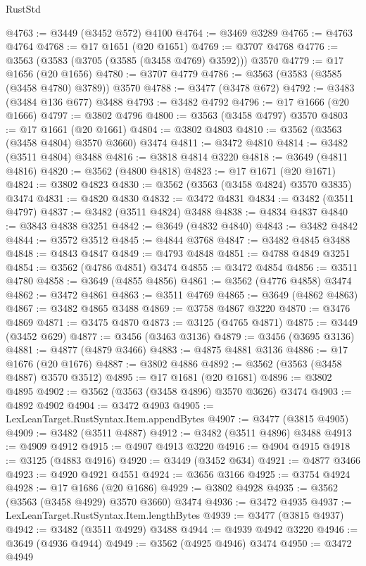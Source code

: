 \begin{lexlean}{RustStd}
\begin{coremodule}
{\begin{coremodule}
{{{{{{{{{{{{{{{{{{{{{{{{{{{{{{{{{{{{{{{{{{{{{@4763 := @3449 (@3452 @572) @4100
@4764 := @3469 @3289
@4765 := @4763 @4764
@4768 := @17 @1651 (@20 @1651)
@4769 := @3707 @4768
@4776 := @3563 (@3583 (@3705 (@3585 (@3458 @4769) @3592))) @3570
@4779 := @17 @1656 (@20 @1656)
@4780 := @3707 @4779
@4786 := @3563 (@3583 (@3585 (@3458 @4780) @3789)) @3570
@4788 := @3477 (@3478 @672)
@4792 := @3483 (@3484 @136 @677) @3488
@4793 := @3482 @4792
@4796 := @17 @1666 (@20 @1666)
@4797 := @3802 @4796
@4800 := @3563 (@3458 @4797) @3570
@4803 := @17 @1661 (@20 @1661)
@4804 := @3802 @4803
@4810 := @3562 (@3563 (@3458 @4804) @3570 @3660) @3474
@4811 := @3472 @4810
@4814 := @3482 (@3511 @4804) @3488
@4816 := @3818 @4814 @3220
@4818 := @3649 (@4811 @4816)
@4820 := @3562 (@4800 @4818)
@4823 := @17 @1671 (@20 @1671)
@4824 := @3802 @4823
@4830 := @3562 (@3563 (@3458 @4824) @3570 @3835) @3474
@4831 := @4820 @4830
@4832 := @3472 @4831
@4834 := @3482 (@3511 @4797)
@4837 := @3482 (@3511 @4824) @3488
@4838 := @4834 @4837
@4840 := @3843 @4838 @3251
@4842 := @3649 (@4832 @4840)
@4843 := @3482 @4842
@4844 := @3572 @3512
@4845 := @4844 @3768
@4847 := @3482 @4845 @3488
@4848 := @4843 @4847
@4849 := @4793 @4848
@4851 := @4788 @4849 @3251
@4854 := @3562 (@4786 @4851) @3474
@4855 := @3472 @4854
@4856 := @3511 @4780
@4858 := @3649 (@4855 @4856)
@4861 := @3562 (@4776 @4858) @3474
@4862 := @3472 @4861
@4863 := @3511 @4769
@4865 := @3649 (@4862 @4863)
@4867 := @3482 @4865 @3488
@4869 := @3758 @4867 @3220
@4870 := @3476 @4869
@4871 := @3475 @4870
@4873 := @3125 (@4765 @4871)
@4875 := @3449 (@3452 @629)
@4877 := @3456 (@3463 @3136)
@4879 := @3456 (@3695 @3136)
@4881 := @4877 (@4879 @3466)
@4883 := @4875 @4881 @3136
@4886 := @17 @1676 (@20 @1676)
@4887 := @3802 @4886
@4892 := @3562 (@3563 (@3458 @4887) @3570 @3512)
@4895 := @17 @1681 (@20 @1681)
@4896 := @3802 @4895
@4902 := @3562 (@3563 (@3458 @4896) @3570 @3626) @3474
@4903 := @4892 @4902
@4904 := @3472 @4903
@4905 := LexLeanTarget.RustSyntax.Item.appendBytes
@4907 := @3477 (@3815 @4905)
@4909 := @3482 (@3511 @4887)
@4912 := @3482 (@3511 @4896) @3488
@4913 := @4909 @4912
@4915 := @4907 @4913 @3220
@4916 := @4904 @4915
@4918 := @3125 (@4883 @4916)
@4920 := @3449 (@3452 @634)
@4921 := @4877 @3466
@4923 := @4920 @4921 @4551
@4924 := @3656 @3166
@4925 := @3754 @4924
@4928 := @17 @1686 (@20 @1686)
@4929 := @3802 @4928
@4935 := @3562 (@3563 (@3458 @4929) @3570 @3660) @3474
@4936 := @3472 @4935
@4937 := LexLeanTarget.RustSyntax.Item.lengthBytes
@4939 := @3477 (@3815 @4937)
@4942 := @3482 (@3511 @4929) @3488
@4944 := @4939 @4942 @3220
@4946 := @3649 (@4936 @4944)
@4949 := @3562 (@4925 @4946) @3474
@4950 := @3472 @4949
}}}}}}}}}}}}}}}}}}}}}}}}}}}}}}}}}}}}}}}}}}}}}
\end{coremodule}}
\end{coremodule}
\end{lexlean}
